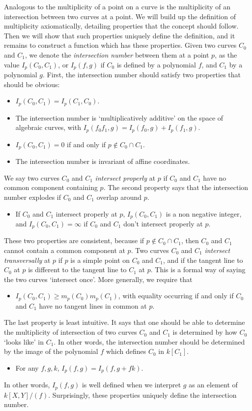 Analogous to the multiplicity of a point on a curve is the multiplicity of an intersection between two curves at a point. We will build up the definition of multiplicity axiomatically, detailing properties that the concept should follow. Then we will show that such properties uniquely define the definition, and it remains to construct a function which has these properties. Given two curves $C_0$ and $C_1$, we denote the \emph{intersection number} between them at a point $p$, as the value $I_p(C_0,C_1)$, or $I_p(f,g)$ if $C_0$ is defined by a polynomial $f$, and $C_1$ by a polynomial $g$. First, the intersection number should satisfy two properties that should be obvious:
%
\begin{itemize}
    \item $I_p(C_0,C_1) = I_p(C_1,C_0)$.
    \item The intersection number is `multiplicatively additive' on the space of algebraic curves, with $I_p(f_0f_1,g) = I_p(f_0,g) + I_p(f_1,g)$.
    \item $I_p(C_0,C_1) = 0$ if and only if $p \not \in C_0 \cap C_1$.
    \item The intersection number is invariant of affine coordinates.
\end{itemize}
%
We say two curves $C_0$ and $C_1$ \emph{intersect properly} at $p$ if $C_0$ and $C_1$ have no common component containing $p$. The second property says that the intersection number explodes if $C_0$ and $C_1$ overlap around $p$.
%
\begin{itemize}
    \item If $C_0$ and $C_1$ intersect properly at $p$, $I_p(C_0,C_1)$ is a non negative integer, and $I_p(C_0,C_1) = \infty$ if $C_0$ and $C_1$ don't intersect properly at $p$.
\end{itemize}
%
These two properties are consistent, because if $p \not \in C_0 \cap C_1$, then $C_0$ and $C_1$ cannot contain a common component at $p$. Two curves $C_0$ and $C_1$ \emph{intersect transversally} at $p$ if $p$ is a simple point on $C_0$ and $C_1$, and if the tangent line to $C_0$ at $p$ is different to the tangent line to $C_1$ at $p$. This is a formal way of saying the two curves `intersect once'. More generally, we require that
%
\begin{itemize}
    \item $I_p(C_0,C_1) \geq m_p(C_0) m_p(C_1)$, with equality occurring if and only if $C_0$ and $C_1$ have no tangent lines in common at $p$.
\end{itemize}
%
The last property is least intuitive. It says that one should be able to determine the multiplicity of intersection of two curves $C_0$ and $C_1$ is determined by how $C_0$ `looks like' in $C_1$. In other words, the intersection number should be determined by the image of the polynomial $f$ which defines $C_0$ in $k[C_1]$.
%
\begin{itemize}
    \item For any $f,g,k$, $I_p(f,g) = I_p(f,g + fk)$.
\end{itemize}
%
In other words, $I_p(f,g)$ is well defined when we interpret $g$ as an element of $k[X,Y]/(f)$. Surprisingly, these properties uniquely define the intersection number.

